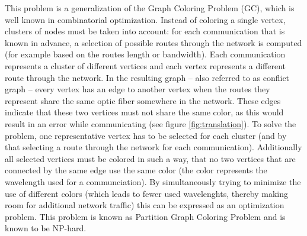 \documentclass[paper=a4,fontsize=12pt]{scrartcl}
\begin{document}
This problem is a generalization of the Graph Coloring Problem (GC), which is well known in combinatorial optimization. Instead of coloring a single vertex, clusters of nodes must be taken into account: for each communication that is known in advance, a selection of possible routes through the network is computed (for example based on the routes length or bandwidth). Each communication represents a cluster of different vertices and each vertex represents a different route through the network. In the resulting graph -- also referred to as conflict graph -- every vertex has an edge to another vertex when the routes they represent share the same optic fiber somewhere in the network. These edges indicate that these two vertices must not share the same color, as this would result in an error while communicating (see figure \ref{fig:translation}). To solve the problem, one representative vertex has to be selected for each cluster (and by that selecting a route through the network for each communication). Additionally all selected vertices must be colored in such a way, that no two vertices that are connected by the same edge use the same color (the color represents the wavelength used for a communciation). By simultaneously trying to minimize the use of different colors (which leads to fewer used wavelenghts, thereby making room for additional network traffic) this can be expressed as  an optimization problem. This problem is known as Partition Graph Coloring Problem and is known to be NP-hard.

\end{document}
